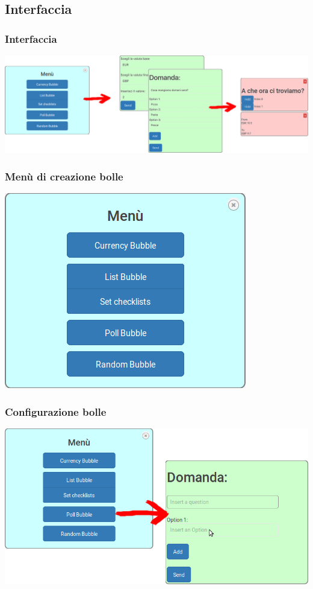 \subsection{Interfaccia}
\begin{frame}
	\frametitle{Interfaccia}
	\includegraphics[scale=0.50]{img/interf.png}
	
\end{frame}
\begin{frame}
	\frametitle{Menù di creazione bolle}
	\includegraphics[scale=0.50]{img/menu.png}
	
\end{frame}


\begin{frame}
	\frametitle{Configurazione bolle}
	\includegraphics[scale=0.35]{img/config.png}
\end{frame}


